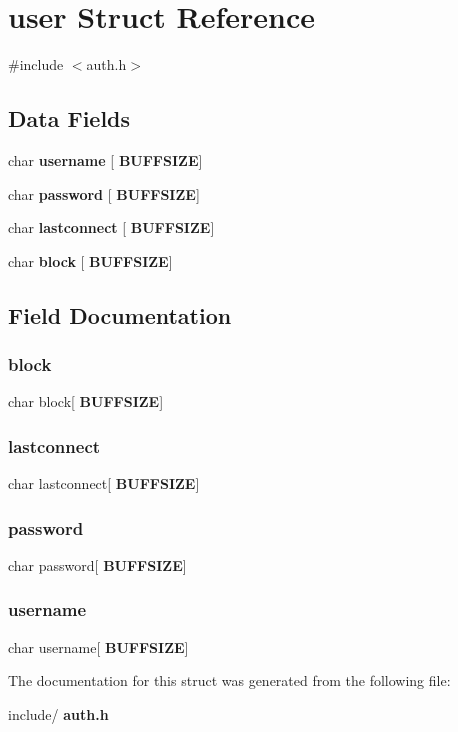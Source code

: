 \section{user Struct Reference}
\label{structuser}


{\ttfamily \#include $<$auth.\+h$>$}

\subsection*{Data Fields}
\begin{DoxyCompactItemize}
\item 
char \textbf{ username} [\textbf{ B\+U\+F\+F\+S\+I\+ZE}]
\item 
char \textbf{ password} [\textbf{ B\+U\+F\+F\+S\+I\+ZE}]
\item 
char \textbf{ lastconnect} [\textbf{ B\+U\+F\+F\+S\+I\+ZE}]
\item 
char \textbf{ block} [\textbf{ B\+U\+F\+F\+S\+I\+ZE}]
\end{DoxyCompactItemize}


\subsection{Field Documentation}
\mbox{\label{structuser_a009391444dc8bb1bde591d0d61b68de3}} 
\subsubsection{block}
{\footnotesize\ttfamily char block[\textbf{ B\+U\+F\+F\+S\+I\+ZE}]}

\mbox{\label{structuser_af048c958a95d92e5a41ced7657385065}} 
\subsubsection{lastconnect}
{\footnotesize\ttfamily char lastconnect[\textbf{ B\+U\+F\+F\+S\+I\+ZE}]}

\mbox{\label{structuser_aca6a393b357d3af054dc060262ab427e}} 
\subsubsection{password}
{\footnotesize\ttfamily char password[\textbf{ B\+U\+F\+F\+S\+I\+ZE}]}

\mbox{\label{structuser_a0a3e67b9f144f2f261876a12d350395b}} 
\subsubsection{username}
{\footnotesize\ttfamily char username[\textbf{ B\+U\+F\+F\+S\+I\+ZE}]}



The documentation for this struct was generated from the following file\+:\begin{DoxyCompactItemize}
\item 
include/\textbf{ auth.\+h}\end{DoxyCompactItemize}
